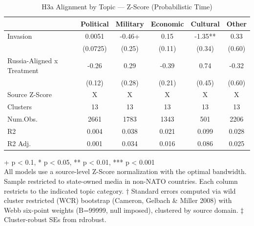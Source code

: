 \begin{table}[t]
\caption{\label{tab:table-s08}H3a Alignment by Topic — Z-Score (Probabilistic Time)}
\fontsize{12.0pt}{14.0pt}\selectfont
\begin{tabular*}{\linewidth}{@{\extracolsep{\fill}}lccccc}
\toprule
  & Political & Military & Economic & Cultural & Other \\ 
\midrule\addlinespace[2.5pt]
Invasion & 0.0051 & -0.46+ & 0.15 & -1.35** & 0.33 \\ 
 & (0.0725) & (0.25) & (0.11) & (0.34) & (0.60) \\ 
Russia-Aligned x Treatment & -0.26 & 0.29 & -0.39 & 0.74 & -0.32 \\ 
{} & {(0.12)} & {(0.28)} & {(0.21)} & {(0.45)} & {(0.60)} \\ 
Source Z-Score & X & X & X & X & X \\ 
Clusters & 13 & 13 & 13 & 13 & 13 \\ 
Num.Obs. & 2661 & 1783 & 1343 & 501 & 2206 \\ 
R2 & 0.004 & 0.038 & 0.021 & 0.099 & 0.028 \\ 
R2 Adj. & 0.001 & 0.034 & 0.016 & 0.086 & 0.025 \\ 
\bottomrule
\end{tabular*}
\begin{minipage}{\linewidth}
\vspace{.05em}
+ p < 0.1, * p < 0.05, ** p < 0.01, *** p < 0.001\\
All models use a source-level Z-Score normalization with the optimal bandwidth.
Sample restricted to state-owned media in non-NATO countries. Each column
restricts to the indicated topic category. † Standard errors computed via
wild cluster restricted (WCR) bootstrap (Cameron, Gelbach \& Miller 2008) with
Webb six-point weights (B=99999, null imposed), clustered by source domain. ‡
Cluster-robust SEs from rdrobust.\\
\end{minipage}
\end{table}

